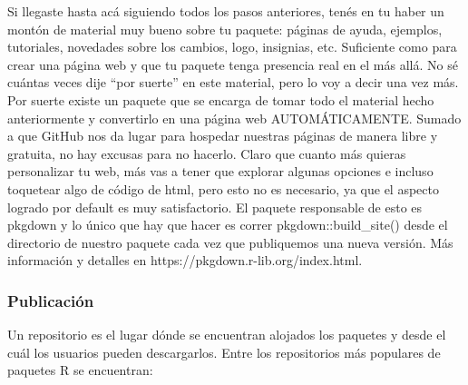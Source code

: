 Si llegaste hasta acá siguiendo todos los pasos anteriores, tenés en tu haber un montón de material muy bueno sobre tu paquete: páginas de ayuda, ejemplos, tutoriales, novedades sobre los cambios, logo, insignias, etc.
Suficiente como para crear una página web y que tu paquete tenga presencia real en el más allá.
No sé cuántas veces dije “por suerte” en este material, pero lo voy a decir una vez más.
Por suerte existe un paquete que se encarga de tomar todo el material hecho anteriormente y convertirlo en una página web AUTOMÁTICAMENTE.
Sumado a que GitHub nos da lugar para hospedar nuestras páginas de manera libre y gratuita, no hay excusas para no hacerlo.
Claro que cuanto más quieras personalizar tu web, más vas a tener que explorar algunas opciones e incluso toquetear algo de código de html, pero esto no es necesario, ya que el aspecto logrado por default es muy satisfactorio.
El paquete responsable de esto es pkgdown y lo único que hay que hacer es correr pkgdown::build\_site() desde el directorio de nuestro paquete cada vez que publiquemos una nueva versión.
Más información y detalles en https://pkgdown.r-lib.org/index.html.



\subsubsection{Publicación}







Un repositorio es el lugar dónde se encuentran alojados los paquetes y desde el cuál los usuarios pueden descargarlos. Entre los repositorios más populares de paquetes R se encuentran:

